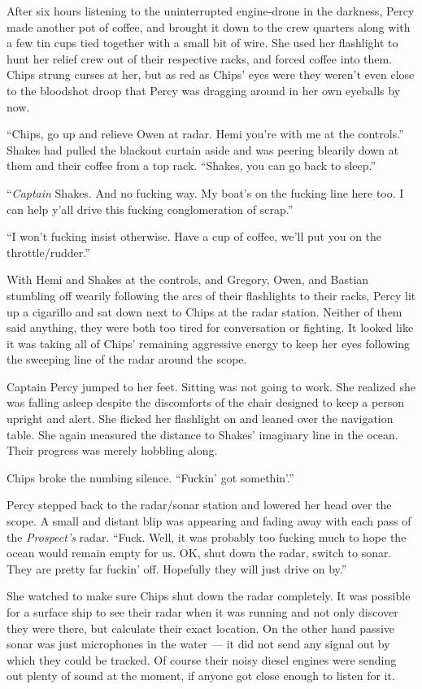 \documentclass[
]{scrbook}
\begin{document}
After six hours listening to the uninterrupted engine-drone in the
darkness, Percy made another pot of coffee, and brought it down to the
crew quarters along with a few tin cups tied together with a small bit
of wire. She used her flashlight to hunt her relief crew out of their
respective racks, and forced coffee into them. Chips strung curses at
her, but as red as Chips' eyes were they weren't even close to the
bloodshot droop that Percy was dragging around in her own eyeballs by
now.

``Chips, go up and relieve Owen at radar. Hemi you're with me at the
controls.'' Shakes had pulled the blackout curtain aside and was peering
blearily down at them and their coffee from a top rack. ``Shakes, you
can go back to sleep.''

``\emph{Captain} Shakes. And no fucking way. My boat's on the fucking
line here too. I can help y'all drive this fucking conglomeration of
scrap.''

``I won't fucking insist otherwise. Have a cup of coffee, we'll put you
on the throttle/rudder.''

With Hemi and Shakes at the controls, and Gregory, Owen, and Bastian
stumbling off wearily following the arcs of their flashlights to their
racks, Percy lit up a cigarillo and sat down next to Chips at the radar
station. Neither of them said anything, they were both too tired for
conversation or fighting. It looked like it was taking all of Chips'
remaining aggressive energy to keep her eyes following the sweeping line
of the radar around the scope.

Captain Percy jumped to her feet. Sitting was not going to work. She
realized she was falling asleep despite the discomforts of the chair
designed to keep a person upright and alert. She flicked her flashlight
on and leaned over the navigation table. She again measured the distance
to Shakes' imaginary line in the ocean. Their progress was merely
hobbling along.

Chips broke the numbing silence. ``Fuckin' got somethin'.''

Percy stepped back to the radar/sonar station and lowered her head over
the scope. A small and distant blip was appearing and fading away with
each pass of the \emph{Prospect's} radar. ``Fuck. Well, it was probably
too fucking much to hope the ocean would remain empty for us. OK, shut
down the radar, switch to sonar. They are pretty far fuckin' off.
Hopefully they will just drive on by.''

She watched to make sure Chips shut down the radar completely. It was
possible for a surface ship to see their radar when it was running and
not only discover they were there, but calculate their exact location.
On the other hand passive sonar was just microphones in the water --- it
did not send any signal out by which they could be tracked. Of course
their noisy diesel engines were sending out plenty of sound at the
moment, if anyone got close enough to listen for it.
\end{document}
